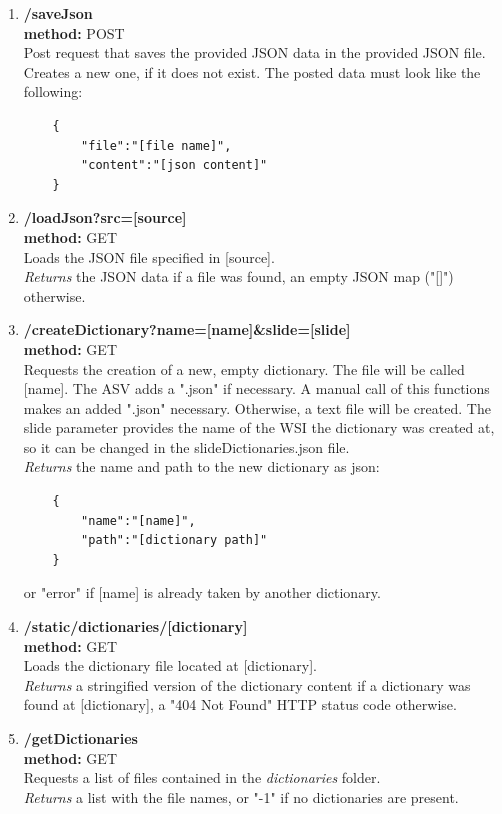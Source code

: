 \begin{enumerate}[(1) -]
	\item \textbf{/saveJson\\
	method:} POST\\
	Post request that saves the provided JSON data in the provided JSON file. Creates a new one, if it does not exist. The posted data must look like the following:
	\begin{lstlisting}
	{
		"file":"[file name]",
		"content":"[json content]"
	}
	\end{lstlisting}
		
	\item \textbf{/loadJson?src=[source]\\
	method:} GET\\
	Loads the JSON file specified in [source].\\
	\emph{Returns} the JSON data if a file was found, an empty JSON map ("[]") otherwise.
	
	\item \textbf{/createDictionary?name=[name]\&slide=[slide]\\
	method:} GET\\
	Requests the creation of a new, empty dictionary. The file will be called [name]. The ASV adds a ".json" if necessary. A manual call of this functions makes an added ".json" necessary. Otherwise, a text file will be created. The slide parameter provides the name of the WSI the dictionary was created at, so it can be changed in the slideDictionaries.json file. \\
	\emph{Returns} the name and path to the new dictionary as json:
	\begin{lstlisting}
	{
		"name":"[name]",
		"path":"[dictionary path]"
	}
	\end{lstlisting}
	or "error" if [name] is already taken by another dictionary.
	
	\item \textbf{/static/dictionaries/[dictionary]\\
		method:} GET\\
	Loads the dictionary file located at [dictionary]. \\
	\emph{Returns} a stringified version of the dictionary content if a dictionary was found at [dictionary], a "404 Not Found" HTTP status code otherwise.
	
	\item \textbf{/getDictionaries\\
	method:} GET\\
	Requests a list of files contained in the \emph{dictionaries} folder.\\
	\emph{Returns} a list with the file names, or "-1" if no dictionaries are present.
	

\end{enumerate}
